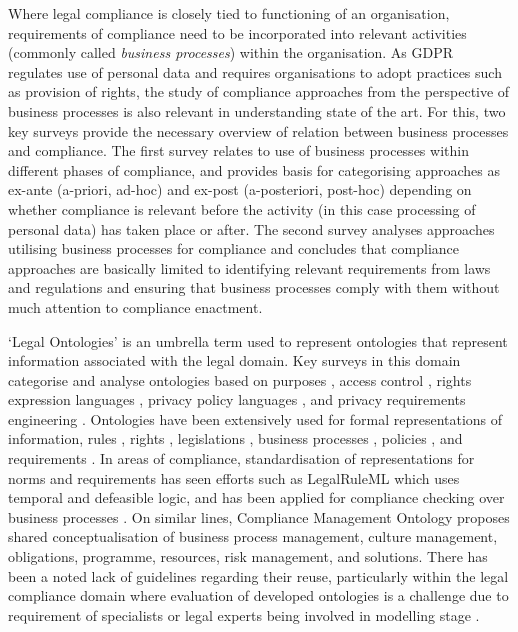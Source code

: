 Where legal compliance is closely tied to functioning of an organisation, requirements of compliance need to be incorporated into relevant activities (commonly called \textit{business processes}) within the organisation.
As GDPR regulates use of personal data and requires organisations to adopt practices such as provision of rights, the study of compliance approaches from the perspective of business processes is also relevant in understanding state of the art. 
For this, two key surveys provide the necessary overview of relation between business processes and compliance. The first survey \cite{fellmann_state---art_2014} relates to use of business processes within different phases of compliance, and provides basis for categorising approaches as ex-ante (a-priori, ad-hoc) and ex-post (a-posteriori, post-hoc) depending on whether compliance is relevant before the activity (in this case processing of personal data) has taken place or after. The second survey \cite{benyoucef_information_2015} analyses approaches utilising business processes for compliance and concludes that compliance approaches are basically limited to identifying relevant requirements from laws and regulations and ensuring that business processes comply with them without much attention to compliance enactment.

`Legal Ontologies' is an umbrella term used to represent ontologies that represent information associated with the legal domain.
Key surveys in this domain categorise and analyse ontologies based on 
purposes \cite{rodrigues_legal_2019}\cite{leone_taking_2019}, 
access control \cite{kirrane_access_2016}, 
rights expression languages \cite{pellegrini_genealogy_2018}, 
privacy policy languages \cite{van_de_ven_qualitative_2016}, and
privacy requirements engineering \cite{gharib_ontologies_2016}.
Ontologies have been extensively used for formal representations of information, rules \cite{kirrane_scalable_2018}, rights \cite{pellegrini_genealogy_2018}, legislations \cite{leone_taking_2019}, business processes \cite{elgammal_formalizing_2016}, policies \cite{van_de_ven_qualitative_2016}, and requirements \cite{gharib_ontologies_2016}.
In areas of compliance, standardisation of representations for norms and requirements has seen efforts such as LegalRuleML \cite{palmirani_legalruleml_2011} which uses temporal and defeasible logic, and has been applied for compliance checking over business processes \cite{governatori_semantic_2016}. On similar lines, Compliance Management Ontology \cite{syed_abdullah_compliance_2012} proposes shared conceptualisation of business process management, culture management, obligations, programme, resources, risk management, and solutions.
There has been a noted lack of guidelines regarding their reuse, particularly within the legal compliance domain \cite{casanovas_legal_2017} where evaluation of developed ontologies is a challenge due to requirement of specialists or legal experts being involved in modelling stage \cite{rodrigues_legal_2019}.

